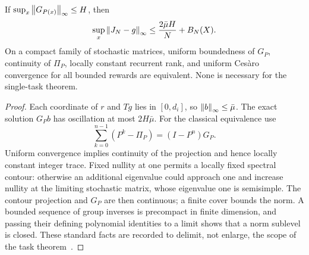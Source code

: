 \begin{corollary}\label{cor:group}
If $\sup_x\left\lVert G_{P(x)}\right\rVert_\infty\le H$, then
\[
 \sup_x\left\lVert J_N-g\right\rVert_\infty\le\frac{2\bar\mu H}{N}+B_N(X).
\]
On a compact family of stochastic matrices, uniform boundedness of $G_P$, continuity of $\Pi_P$, locally constant recurrent rank, and uniform Ces\`aro convergence for all bounded rewards are equivalent. None is necessary for the single-task theorem.
\end{corollary}
\begin{proof}
Each coordinate of $r$ and $Tg$ lies in $[0,d_i]$, so $\left\lVert b\right\rVert_\infty\le\bar\mu$. The exact solution $G_Pb$ has oscillation at most $2H\bar\mu$. For the classical equivalence use
\[
 \sum_{k=0}^{n-1}(P^k-\Pi_P)=(I-P^n)G_P.
\]
Uniform convergence implies continuity of the projection and hence locally constant integer trace. Fixed nullity at one permits a locally fixed spectral contour: otherwise an additional eigenvalue could approach one and increase nullity at the limiting stochastic matrix, whose eigenvalue one is semisimple. The contour projection and $G_P$ are then continuous; a finite cover bounds the norm. A bounded sequence of group inverses is precompact in finite dimension, and passing their defining polynomial identities to a limit shows that a norm sublevel is closed. These standard facts are recorded to delimit, not enlarge, the scope of the task theorem~\cite{Meyer,LamondPuterman}.
\end{proof}


